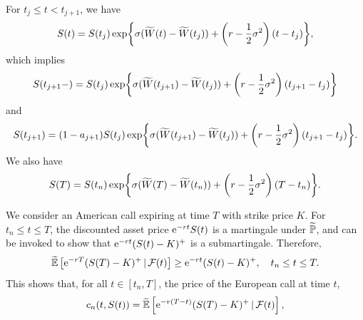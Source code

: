 For \(t_j \le t < t_{j+1}\), we have
\begin{equation}
	S(t) = S(t_j) \exp \set[\bigg]{ \sigma (\widetilde{W}(t) - \widetilde{W}(t_j)) + \left( r - \frac{1}{2}\sigma^2 \right) (t - t_j) }, \label{eq:AssetPriceDynamics}
\end{equation}
which implies
\begin{equation}
	S(t_{j+1}-) = S(t_j) \exp \set[\bigg]{ \sigma (\widetilde{W}(t_{j+1}) - \widetilde{W}(t_j)) + \left( r - \frac{1}{2}\sigma^2 \right) (t_{j+1} - t_j) } \label{eq:AssetPricePreDividend}
\end{equation}
and
\begin{equation}
	S(t_{j+1}) = (1 - a_{j+1})S(t_j) \exp \set[\bigg]{ \sigma (\widetilde{W}(t_{j+1}) - \widetilde{W}(t_j)) + \left( r - \frac{1}{2}\sigma^2 \right) (t_{j+1} - t_j) }. \label{eq:AssetPricePostDividend}
\end{equation}
We also have
\begin{equation}
	S(T) = S(t_n) \exp \set[\bigg]{ \sigma (\widetilde{W}(T) - \widetilde{W}(t_n)) + \left( r - \frac{1}{2}\sigma^2 \right) (T - t_n) }. \label{eq:TerminalAssetPrice}
\end{equation}

We consider an American call expiring at time \(T\) with strike price \(K\). For \(t_n \le t \le T\), the discounted asset price \(\e^{-rt}S(t)\) is a martingale under \(\widetilde{\Prob}\), and  can be invoked to show that \(\e^{-rt}(S(t) - K)^+\) is a submartingale. Therefore,
\begin{equation}
	\widetilde{\E} \left[ \e^{-rT} (S(T) - K)^+ \gvn \cF(t) \right] \ge \e^{-rt} (S(t) - K)^+, \quad t_n \le t \le T. \label{eq:SubmartingaleProperty}
\end{equation}
This shows that, for all \(t \in [t_n, T]\), the price of the European call at time \(t\),
\begin{equation}
	c_n(t, S(t)) = \widetilde{\E} \left[ \e^{-r(T-t)} (S(T) - K)^+ \gvn \cF(t) \right], \label{eq:EuropeanCallValue}
\end{equation}

